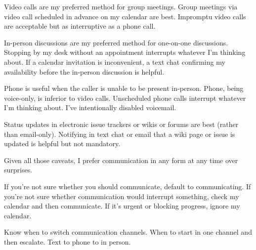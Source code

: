 Video calls are my preferred method for group meetings. Group meetings via video call scheduled in advance on my calendar are best. Impromptu video calls are acceptable but as interruptive as a phone call. 

In-person discussions are my preferred method for one-on-one discussions. Stopping by my desk  without an appointment interrupts whatever I'm thinking about. If a calendar invitation is inconvenient, a text chat confirming my availability before the in-person discussion is helpful. 

Phone is useful when the caller is unable to be present in-person. Phone, being voice-only, is inferior to video calls. Unscheduled phone calls interrupt whatever I'm thinking about. I've intentionally disabled voicemail. 

Status updates in electronic issue trackers or wikis or forums are best (rather than email-only). Notifying in text chat or email that a wiki page or issue is updated is helpful but not mandatory. 

Given all those caveats, I prefer communication in any form at any time over surprises. 

If you're not sure whether you should communicate, default to communicating. If you're not sure whether communication would interrupt something, check my calendar and then communicate. If it's urgent or blocking progress, ignore my calendar. 

Know when to switch communication channels.
When to start in one channel and then escalate. Text to phone to in person.
